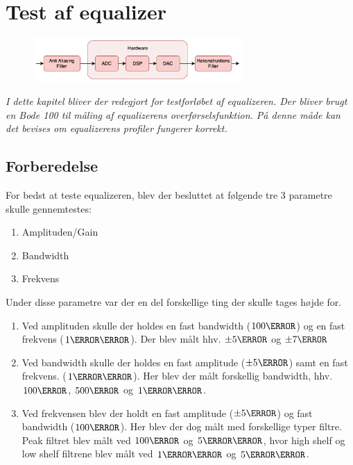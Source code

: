 \chapter{Test af equalizer}\label{sec:test_eq}


\begin{figure}[h]
	\vspace*{-1 cm}
	\includegraphics[width=8cm]{billeder/flow_all}
	\vspace{0.5 cm}
\end{figure}


\emph{I dette kapitel bliver der redegjort for testforløbet af equalizeren. Der bliver brugt en Bode 100 til måling af equalizerens overførselsfunktion. På denne måde kan det bevises om equalizerens profiler fungerer korrekt.}

\section{Forberedelse}


For bedst at teste equalizeren, blev der besluttet at følgende tre 3 parametre skulle gennemtestes: 

\begin{enumerate}
    \item Amplituden/Gain
    \item Bandwidth
    \item Frekvens \\
\end{enumerate}



Under disse parametre var der en del forskellige ting der skulle tages højde for. 
\begin{enumerate}
    \item Ved amplituden skulle der holdes en fast bandwidth ($100\hertz$) og en fast frekvens ($1\kilo\hertz$). Der blev målt hhv. $\pm5\decibel$ og $\pm7\decibel$
    \item Ved bandwidth skulle der holdes en fast amplitude ($\pm5\decibel$) samt en fast frekvens. ($1\kilo\hertz$). Her blev der målt forskellig bandwidth, hhv. $100\hertz$, $500\hertz$ og $1\kilo\hertz$.
    \item Ved frekvensen blev der holdt en fast amplitude ($\pm5\decibel$) og fast bandwidth ($100\hertz$). Her blev der dog målt med forskellige typer filtre. Peak filtret blev målt ved $100\hertz$ og $5\kilo\hertz$, hvor high shelf og low shelf filtrene blev målt ved $1\kilo\hertz$ og $5\kilo\hertz$. \\
\end{enumerate}

